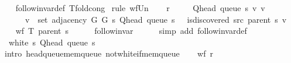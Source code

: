 \begin{isabellebody}
%
\isadelimproof
\ \ %
\endisadelimproof
%
\isatagproof
{}\isamarkupfalse%
\ follow{\isacharunderscore}{\kern0pt}invar{\isacharunderscore}{\kern0pt}def\ T{\isacharunderscore}{\kern0pt}fold{\isacharunderscore}{\kern0pt}cong\isanewline
{}\isamarkupfalse%
\ {\isacharparenleft}{\kern0pt}rule\ wf{\isacharunderscore}{\kern0pt}Un{\isacharparenright}{\kern0pt}\isanewline
\ \ \isamarkupfalse%
\ {\isacharquery}{\kern0pt}r\ {\isacharequal}{\kern0pt}\isanewline
\ \ \ \ {\isachardoublequoteopen}{\isacharbraceleft}{\kern0pt}{\isacharparenleft}{\kern0pt}Q{\isacharunderscore}{\kern0pt}head\ {\isacharparenleft}{\kern0pt}queue\ s{\isacharparenright}{\kern0pt}{\isacharcomma}{\kern0pt}\ v{\isacharparenright}{\kern0pt}\ {\isacharbar}{\kern0pt}v{\isachardot}{\kern0pt}\isanewline
\ \ \ \ \ \ v\ {\isasymin}\ set\ {\isacharparenleft}{\kern0pt}adjacency\ G{}\ G{}\ s\ {\isacharparenleft}{\kern0pt}Q{\isacharunderscore}{\kern0pt}head\ {\isacharparenleft}{\kern0pt}queue\ s{\isacharparenright}{\kern0pt}{\isacharparenright}{\kern0pt}{\isacharparenright}{\kern0pt}\ {\isasymand}\ {\isasymnot}\ is{\isacharunderscore}{\kern0pt}discovered\ src\ {\isacharparenleft}{\kern0pt}parent\ s{\isacharparenright}{\kern0pt}\ v{\isacharbraceright}{\kern0pt}{\isachardoublequoteclose}\isanewline
\ \ \isamarkupfalse%
\ {\isachardoublequoteopen}wf\ {\isacharparenleft}{\kern0pt}T\ {\isacharparenleft}{\kern0pt}parent\ s{\isacharparenright}{\kern0pt}{\isacharparenright}{\kern0pt}{\isachardoublequoteclose}\isanewline
\ \ \ \ \isamarkupfalse%
\ follow{\isacharunderscore}{\kern0pt}invar\isanewline
\ \ \ \ \isamarkupfalse%
\ {\isacharparenleft}{\kern0pt}simp\ add{\isacharcolon}{\kern0pt}\ follow{\isacharunderscore}{\kern0pt}invar{\isacharunderscore}{\kern0pt}def{\isacharparenright}{\kern0pt}\isanewline
\ \ \isamarkupfalse%
\ {\isachardoublequoteopen}{\isasymnot}\ white\ s\ {\isacharparenleft}{\kern0pt}Q{\isacharunderscore}{\kern0pt}head\ {\isacharparenleft}{\kern0pt}queue\ s{\isacharparenright}{\kern0pt}{\isacharparenright}{\kern0pt}{\isachardoublequoteclose}\isanewline
\ \ \ \ \isamarkupfalse%
\ {\isacharparenleft}{\kern0pt}intro\ head{\isacharunderscore}{\kern0pt}queue{\isacharunderscore}{\kern0pt}mem{\isacharunderscore}{\kern0pt}queue\ not{\isacharunderscore}{\kern0pt}white{\isacharunderscore}{\kern0pt}if{\isacharunderscore}{\kern0pt}mem{\isacharunderscore}{\kern0pt}queue{\isacharparenright}{\kern0pt}\isanewline
\ \ \isamarkupfalse%
\ {\isachardoublequoteopen}wf\ {\isacharquery}{\kern0pt}r{\isachardoublequoteclose}\isanewline

\end{isabellebody}
